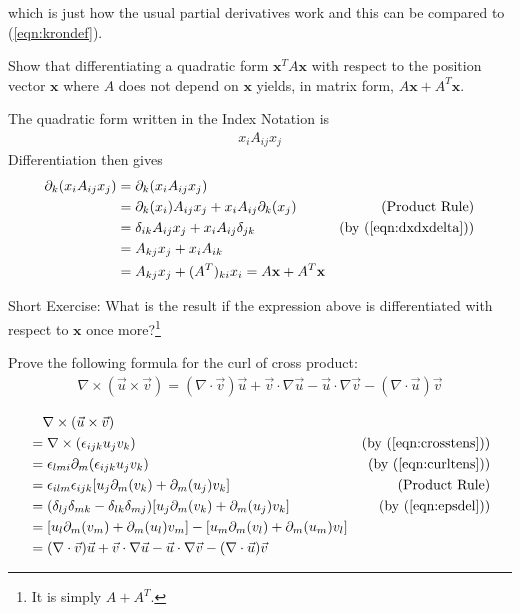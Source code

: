 which is just how the usual partial derivatives work and this can be compared to (\ref{eqn:krondef}).
\begin{exmp}
Show that differentiating a quadratic form $\textbf{x}^TA\textbf{x}$ with respect to the position vector $\textbf{x}$ where $A$ does not depend on $\textbf{x}$ yields, in matrix form, $A\textbf{x} + A^T\textbf{x}$.
\end{exmp}
\begin{solution}
The quadratic form written in the Index Notation is
\begin{align*}
x_iA_{ij}x_j
\end{align*}
Differentiation then gives
\begin{align*}
\partial_k (x_iA_{ij}x_j) &= \partial_k (x_iA_{ij}x_j) \\
&= \partial_k (x_i) A_{ij}x_j + x_iA_{ij} \partial_k (x_j) & \text{(Product Rule)} \\
&= \delta_{ik} A_{ij}x_j + x_iA_{ij} \delta_{jk} & \text{(by (\ref{eqn:dxdxdelta}))} \\
&= A_{kj}x_j + x_iA_{ik} \\
&= A_{kj}x_j + (A^T)_{ki}x_i = A\textbf{x} + A^T\textbf{x}
\end{align*}
\end{solution}
Short Exercise: What is the result if the expression above is differentiated with respect to $\textbf{x}$ once more?\footnote{It is simply $A+A^T$.}

\begin{exmp}
Prove the following formula for the curl of cross product:
\begin{align}
\nabla \times (\vec{u} \times \vec{v}) = (\nabla \cdot \vec{v})\vec{u} + \vec{v} \cdot \nabla\vec{u} - \vec{u} \cdot \nabla\vec{v} - (\nabla \cdot \vec{u})\vec{v}  
\end{align}
\end{exmp}
\begin{solution}
\begin{align*}
&\quad \nabla \times (\vec{u} \times \vec{v}) \\
&= \nabla \times (\epsilon_{ijk}u_jv_k) &\text{(by (\ref{eqn:crosstens}))} \\
&= \epsilon_{lmi}\partial_m (\epsilon_{ijk}u_jv_k) &\text{(by (\ref{eqn:curltens}))} \\
&= \epsilon_{ilm}\epsilon_{ijk} [u_j\partial_m(v_k) + \partial_m(u_j)v_k] &\text{(Product Rule)} \\
&= (\delta_{lj}\delta_{mk} - \delta_{lk}\delta_{mj}) [u_j\partial_m(v_k) + \partial_m(u_j)v_k] &\text{(by (\ref{eqn:epsdel}))} \\
&= [u_l\partial_m(v_m) + \partial_m(u_l)v_m] - [u_m\partial_m(v_l) + \partial_m(u_m)v_l] \\
&= (\nabla \cdot \vec{v})\vec{u} + \vec{v} \cdot \nabla\vec{u} - \vec{u} \cdot \nabla\vec{v} - (\nabla \cdot \vec{u})\vec{v}
\end{align*}
\end{solution}

